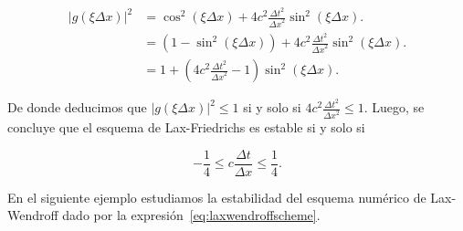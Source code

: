 \begin{example}
  \begin{align*}
    {\left|g\left(\xi\Delta x\right)\right|}^{2} & =
    \cos^{2}
    \left(\xi\Delta x\right)+
    4c^{2}
    \frac{{\Delta t}^{2}}{{\Delta x}^{2}}
    \sin^{2}
    \left(\xi\Delta x\right).                        \\
                                                 & =
    \left(
    1-
    \sin^{2}
    \left(\xi\Delta x\right)
    \right)+
    4c^{2}
    \frac{{\Delta t}^{2}}{{\Delta x}^{2}}
    \sin^{2}\left(\xi\Delta x\right).                \\
                                                 & =
    1+
    \left(
    4c^{2}
    \frac{{\Delta t}^{2}}{{\Delta x}^{2}}-
    1
    \right)
    \sin^{2}\left(\xi\Delta x\right).
  \end{align*}

  De donde deducimos que
  \begin{math}
    {\left|
      g
      \left(
      \xi\Delta x
      \right)
      \right|}^{2}\leq
    1
  \end{math}
  si y solo si
  \begin{math}
    4c^{2}
    \frac{{\Delta t}^{2}}{{\Delta x}^{2}}\leq
    1
  \end{math}.
  Luego, se concluye que el esquema de Lax-Friedrichs es estable si
  y solo si

  \begin{equation*}
    -\frac{1}{4}\leq
    c\frac{\Delta t}{\Delta x}\leq
    \frac{1}{4}.
  \end{equation*}
\end{example}

En el siguiente ejemplo estudiamos la estabilidad del esquema
numérico de Lax-Wendroff dado por la
expresión~\eqref{eq:laxwendroffscheme}.

